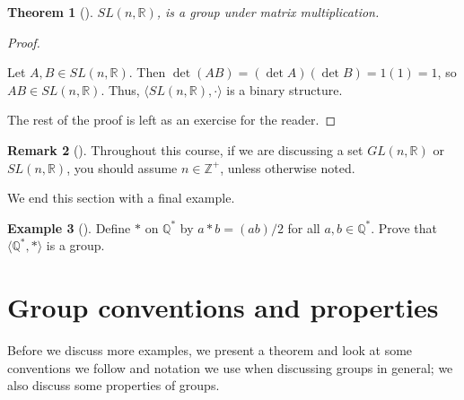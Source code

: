 \documentclass[10pt,]{book}
\theoremstyle{plain}
\newtheorem{theorem}{Theorem}[section]
\theoremstyle{definition}
\theoremstyle{definition}
\newtheorem{remark}[theorem]{Remark}
\theoremstyle{definition}
\newtheorem{example}[theorem]{Example}
\theoremstyle{definition}
\numberwithin{equation}{section}
\def\Z{\mathbb{Z}}
\def\R{\mathbb{R}}
\def\Q{\mathbb{Q}}
\begin{document}
\begin{theorem}[{}]\label{sl}
\(SL(n,\R)\), is a group under matrix multiplication.%
\end{theorem}
\begin{proof}\hypertarget{proof-8}{}
Let \(A,B\in SL(n, \R)\). Then \(\det(AB)=(\det A)(\det B) =1(1)=1\), so \(AB\in SL(n,\R)\).  Thus, \(\langle SL(n,\R), \cdot\rangle\) is a binary structure.%
\par
The rest of the proof is left as an exercise for the reader.%
\end{proof}
\begin{remark}[]\label{remark-8}
Throughout this course, if we are discussing a set \(GL(n,\R)\) or \(SL(n,\R)\), you should assume \(n\in \Z^+\), unless otherwise noted.%
\end{remark}
We end this section with a final example.%
\begin{example}[]\label{example-14}
Define \(*\) on \(\Q^*\) by \(a*b=(ab)/2\) for all \(a,b\in \Q^*\). Prove that \(\langle \Q^*,*\rangle\) is a group.%
\end{example}
\typeout{************************************************}
\typeout{************************************************}
\section[{Group conventions and properties}]{Group conventions and properties}\label{gpconvs}
Before we discuss more examples, we present a theorem and look at some conventions we follow and notation we use when discussing groups in general; we also discuss some properties of groups.%
\typeout{************************************************}
\typeout{************************************************}
\end{document}
